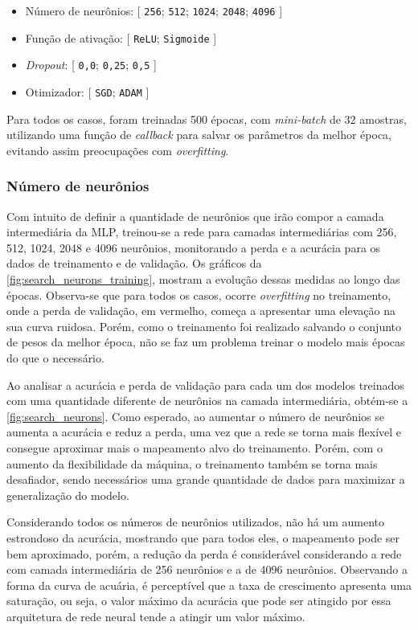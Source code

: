 \begin{itemize}
	\item Número de neurônios: [ \texttt{256}; \texttt{512}; \texttt{1024}; \texttt{2048}; \texttt{4096} ]
	\item Função de ativação: [ \texttt{ReLU}; \texttt{Sigmoide} ]
	\item \textit{Dropout}: [ \texttt{0,0}; \texttt{0,25}; \texttt{0,5} ]
	\item Otimizador: [ \texttt{SGD}; \texttt{ADAM} ]
\end{itemize} 

Para todos os casos, foram treinadas 500 épocas, com \textit{mini-batch} de 32 amostras, utilizando uma função de \textit{callback} para salvar os parâmetros da melhor época, evitando assim preocupações com \textit{overfitting}.

\subsubsection{Número de neurônios}

Com intuito de definir a quantidade de neurônios que irão compor a camada intermediária da MLP, treinou-se a rede para camadas intermediárias com 256, 512, 1024, 2048 e 4096 neurônios, monitorando a perda e a acurácia para os dados de treinamento e de validação. Os gráficos da \autoref{fig:search_neurons_training}, mostram a evolução dessas medidas ao longo das épocas. Observa-se que para todos os casos, ocorre \textit{overfitting} no treinamento, onde a perda de validação, em vermelho, começa a apresentar uma elevação na sua curva ruidosa. Porém, como o treinamento foi realizado salvando o conjunto de pesos da melhor época, não se faz um problema treinar o modelo mais épocas do que o necessário.



Ao analisar a acurácia e perda de validação para cada um dos modelos treinados com uma quantidade diferente de neurônios na camada intermediária, obtém-se a \autoref{fig:search_neurons}. Como esperado, ao aumentar o número de neurônios se aumenta a acurácia e reduz a perda, uma vez que a rede se torna mais flexível e consegue aproximar mais o mapeamento alvo do treinamento. Porém, com o aumento da flexibilidade da máquina, o treinamento também se torna mais desafiador, sendo necessários uma grande quantidade de dados para maximizar a generalização do modelo.

Considerando todos os números de neurônios utilizados, não há um aumento estrondoso da acurácia, mostrando que para todos eles, o mapeamento pode ser bem aproximado, porém, a redução da perda é considerável considerando a rede com camada intermediária de 256 neurônios e a de 4096 neurônios. Observando a forma da curva de acuária, é perceptível que a taxa de crescimento apresenta uma saturação, ou seja, o valor máximo da acurácia que pode ser atingido por essa arquitetura de rede neural tende a atingir um valor máximo.

